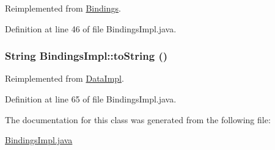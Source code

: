 Reimplemented from \hyperlink{interfaceBindings_a2}{Bindings}.

Definition at line 46 of file Bindings\-Impl.java.\hypertarget{classBindingsImpl_a4}{
\subsubsection[toString]{\setlength{\rightskip}{0pt plus 5cm}String Bindings\-Impl::to\-String ()}}
\label{classBindingsImpl_a4}




Reimplemented from \hyperlink{classDataImpl_a6}{Data\-Impl}.

Definition at line 65 of file Bindings\-Impl.java.

The documentation for this class was generated from the following file:\begin{CompactItemize}
\item 
\hyperlink{BindingsImpl_8java-source}{Bindings\-Impl.java}\end{CompactItemize}

